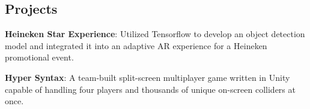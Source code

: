 \documentclass[margin]{res}
\begin{document}
\begin{resume}
\section{Projects}
\phantom{spacing}
\par
\textbf{Heineken Star Experience}: 
Utilized Tensorflow to develop an object detection model and integrated it into an adaptive AR experience for a Heineken promotional event. 

\par
\textbf{Hyper Syntax}: 
A team-built split-screen multiplayer game written in Unity capable of handling four players and thousands of unique on-screen colliders at once. 



\end{resume}
\end{document}
